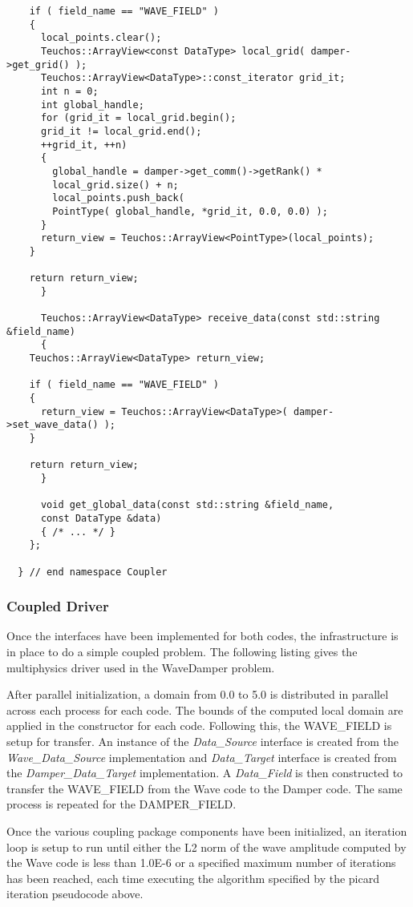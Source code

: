 \documentclass[letterpaper]{article}
\begin{document}
\begin{lstlisting}
	if ( field_name == "WAVE_FIELD" )
	{
	  local_points.clear();
	  Teuchos::ArrayView<const DataType> local_grid( damper->get_grid() );
	  Teuchos::ArrayView<DataType>::const_iterator grid_it;
	  int n = 0;
	  int global_handle;
	  for (grid_it = local_grid.begin(); 
	  grid_it != local_grid.end();
	  ++grid_it, ++n)
	  {
	    global_handle = damper->get_comm()->getRank() *
	    local_grid.size() + n;
	    local_points.push_back( 
	    PointType( global_handle, *grid_it, 0.0, 0.0) );
	  }
	  return_view = Teuchos::ArrayView<PointType>(local_points);
	}

	return return_view;
      }

      Teuchos::ArrayView<DataType> receive_data(const std::string &field_name)
      {
	Teuchos::ArrayView<DataType> return_view;

	if ( field_name == "WAVE_FIELD" )
	{
	  return_view = Teuchos::ArrayView<DataType>( damper->set_wave_data() );
	}

	return return_view;
      }

      void get_global_data(const std::string &field_name,
      const DataType &data)
      { /* ... */ }
    };

  } // end namespace Coupler
\end{lstlisting}

\subsubsection{Coupled Driver}
Once the interfaces have been implemented for both codes, the
infrastructure is in place to do a simple coupled problem. The
following listing gives the multiphysics driver used in the WaveDamper
problem.

After parallel initialization, a domain from 0.0 to 5.0 is distributed
in parallel across each process for each code. The bounds of the
computed local domain are applied in the constructor for each
code. Following this, the WAVE\_FIELD is setup for transfer. An
instance of the {\sl Data\_Source} interface is created from the {\sl
  Wave\_Data\_Source} implementation and {\sl Data\_Target} interface
is created from the {\sl Damper\_Data\_Target} implementation. A {\sl
  Data\_Field} is then constructed to transfer the WAVE\_FIELD from
the Wave code to the Damper code. The same process is repeated for the
DAMPER\_FIELD. 

Once the various coupling package components have been initialized, an
iteration loop is setup to run until either the L2 norm of the wave
amplitude computed by the Wave code is less than 1.0E-6 or a specified
maximum number of iterations has been reached, each time executing the
algorithm specified by the picard iteration pseudocode above.
\end{document}
